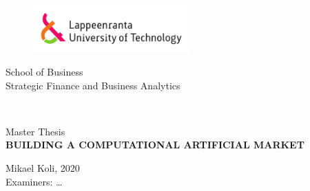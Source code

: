 
\thispagestyle{empty} \setlength{\parindent}{0pt}
\begin{figure}
\includegraphics[width=60mm]{./figs/Merkki_Logo_CMYK}\\
\end{figure}

\begin{flushleft}
    \vspace{60mm}
    School of Business\\
    Strategic Finance and Business Analytics
\end{flushleft}

~\\

\begin{center}
    \vspace{60mm}
    \Large
    \sffamily 
    Master Thesis\\
    \textbf{\MakeUppercase{Building a Computational Artificial Market}}\\

\end{center}

\vspace*{\fill}

\begin{flushright}
    \vspace{60mm}
    Mikael Koli, 2020\\
    Examiners: \dots
\end{flushright}